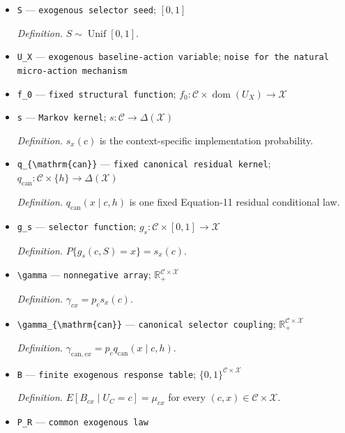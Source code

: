\documentclass{article}
\begin{document}
\begin{itemize}
  \item \texttt{S} --- \texttt{exogenous selector seed}; \([0,1]\)
  \par\smallskip\noindent\emph{Definition.} \(S\sim\operatorname{Unif}[0,1]\).
  \item \texttt{U\_\allowbreak{}X} --- \texttt{exogenous baseline-\allowbreak{}action variable}; \texttt{noise for the natural micro-\allowbreak{}action mechanism}
  \item \texttt{f\_\allowbreak{}0} --- \texttt{fixed structural function}; \(f_0:\mathcal C\times\operatorname{dom}(U_X)\to\mathcal X\)
  \item \texttt{s} --- \texttt{Markov kernel}; \(s:\mathcal C\to\Delta(\mathcal X)\)
  \par\smallskip\noindent\emph{Definition.} \(s_x(c)\) is the context-specific implementation probability.
  \item \texttt{q\_\allowbreak{}\{\textbackslash{}\allowbreak{}mathrm\{can\}\allowbreak{}\}\allowbreak{}} --- \texttt{fixed canonical residual kernel}; \(q_{\mathrm{can}}:\mathcal C\times\{h\}\to\Delta(\mathcal X)\)
  \par\smallskip\noindent\emph{Definition.} \(q_{\mathrm{can}}(x\mid c,h)\) is one fixed Equation-11 residual conditional law.
  \item \texttt{g\_\allowbreak{}s} --- \texttt{selector function}; \(g_s:\mathcal C\times[0,1]\to\mathcal X\)
  \par\smallskip\noindent\emph{Definition.} \(P\{g_s(c,S)=x\}=s_x(c)\).
  \item \texttt{\textbackslash{}\allowbreak{}gamma} --- \texttt{nonnegative array}; \(\mathbb R_+^{\mathcal C\times\mathcal X}\)
  \par\smallskip\noindent\emph{Definition.} \(\gamma_{cx}=p_cs_x(c)\).
  \item \texttt{\textbackslash{}\allowbreak{}gamma\_\allowbreak{}\{\textbackslash{}\allowbreak{}mathrm\{can\}\allowbreak{}\}\allowbreak{}} --- \texttt{canonical selector coupling}; \(\mathbb R_+^{\mathcal C\times\mathcal X}\)
  \par\smallskip\noindent\emph{Definition.} \(\gamma_{\mathrm{can},cx}=p_cq_{\mathrm{can}}(x\mid c,h)\).
  \item \texttt{B} --- \texttt{finite exogenous response table}; \(\{0,1\}^{\mathcal C\times\mathcal X}\)
  \par\smallskip\noindent\emph{Definition.} \(E[B_{cx}\mid U_C=c]=\mu_{cx}\) for every \((c,x)\in\mathcal C\times\mathcal X\).
  \item \texttt{P\_\allowbreak{}R} --- \texttt{common exogenous law}

\end{itemize}
\end{document}
